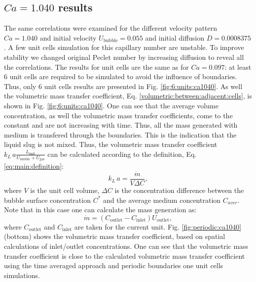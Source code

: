 \documentclass{article}
\newcommand{\beq}{\begin{equation}}
\newcommand{\feq}{\end{equation}}
\newcommand{\vol}{k_L\,a}
\newcommand{\lunit}{L_{\mathrm{unit}}}
\newcommand{\ububble}{U_{\mathrm{bubble}}}
\newcommand{\ugas}{U_{\mathrm{gas}}}
\newcommand{\uoutlet}{U_{\mathrm{outlet}}}
\newcommand{\cinlet}{C_{\mathrm{inlet}}}
\newcommand{\coutlet}{C_{\mathrm{outlet}}}
\newcommand{\cstar}{C^{*}}
\newcommand{\volnondim}{\vol \frac{\lunit}{\ububble+\ugas}}
\begin{document}
\subsection{$Ca=1.040$ results}
The same correlations were examined for the different velocity pattern $Ca=1.040$ and initial
velocity $\ububble=0.055$ and initial diffusion $D=0.0008375$. A few unit cells simulation for
this
capillary number are unstable. To improve stability we changed original Peclet number by increasing
diffusion to reveal all the correlations. The results for unit cells are the same as for $Ca=0.097$:
at least $6$ unit cells are required to be simulated to avoid the influence of boundaries. Thus,
only $6$ unit cells results are presented in Fig. \ref{fig:6:units:ca1040}. As well the volumetric
mass transfer coefficient, Eq. \ref{volumetric:between:adjacent:cells}, is shown in Fig.
\ref{fig:6:units:ca1040}. One can see that the average volume concentration, as well the volumetric
mass transfer coefficients, come to the constant and are not increasing with time. Thus, all the
mass generated with medium is transfered through the boundaries. This is the indication that the
liquid slug is not mixed. Thus, the volumetric mass transfer coefficient $\volnondim$ can be
calculated according to the definition, Eq. \ref{eq:main:definition}:
\beq
\label{inlet:outlet:spatial:location}
\vol = \frac{\dot{m}}{V \Delta C},
\feq 
where $V$ is the unit cell volume, $\Delta C$ is the concentration difference between the bubble
surface concentration $\cstar$ and the average medium concentration $C_{aver}$. Note that in this
case one can calculate the mass generation as:
\beq
\dot{m}=(\coutlet-\cinlet)\uoutlet,
\feq
where $\coutlet$ and $\cinlet$ are taken for the current unit. Fig. \ref{fig:periodic:ca1040}
(bottom) shows the volumetric mass transfer coefficient, based on spatial calculations of
inlet/outlet concentrations. One can see that the volumetric mass transfer coefficient is close to
the calculated volumetric mass transfer coefficient using the time averaged approach and periodic
boundaries one unit cells simulations. 
\end{document}
